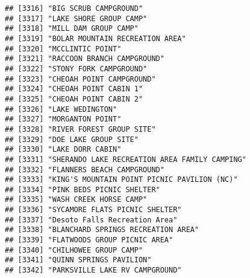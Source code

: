 \documentclass[
]{article}
\begin{document}
\begin{verbatim}
## [3316] "BIG SCRUB CAMPGROUND"                                                                
## [3317] "LAKE SHORE GROUP CAMP"                                                               
## [3318] "MILL DAM GROUP CAMP"                                                                 
## [3319] "BOLAR MOUNTAIN RECREATION AREA"                                                      
## [3320] "MCCLINTIC POINT"                                                                     
## [3321] "RACCOON BRANCH CAMPGROUND"                                                           
## [3322] "STONY FORK CAMPGROUND"                                                               
## [3323] "CHEOAH POINT CAMPGROUND"                                                             
## [3324] "CHEOAH POINT CABIN 1"                                                                
## [3325] "CHEOAH POINT CABIN 2"                                                                
## [3326] "LAKE WEDINGTON"                                                                      
## [3327] "MORGANTON POINT"                                                                     
## [3328] "RIVER FOREST GROUP SITE"                                                             
## [3329] "DOE LAKE GROUP SITE"                                                                 
## [3330] "LAKE DORR CABIN"                                                                     
## [3331] "SHERANDO LAKE RECREATION AREA FAMILY CAMPING"                                        
## [3332] "FLANNERS BEACH CAMPGROUND"                                                           
## [3333] "KING'S MOUNTAIN POINT PICNIC PAVILION (NC)"                                          
## [3334] "PINK BEDS PICNIC SHELTER"                                                            
## [3335] "WASH CREEK HORSE CAMP"                                                               
## [3336] "SYCAMORE FLATS PICNIC SHELTER"                                                       
## [3337] "Desoto Falls Recreation Area"                                                        
## [3338] "BLANCHARD SPRINGS RECREATION AREA"                                                   
## [3339] "FLATWOODS GROUP PICNIC AREA"                                                         
## [3340] "CHILHOWEE GROUP CAMP"                                                                
## [3341] "QUINN SPRINGS PAVILION"                                                              
## [3342] "PARKSVILLE LAKE RV CAMPGROUND"                                                       

\end{verbatim}
\end{document}
